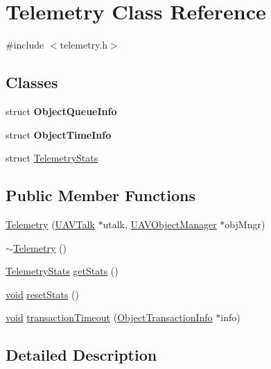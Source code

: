 \hypertarget{class_telemetry}{\section{\-Telemetry \-Class \-Reference}
\label{class_telemetry}
}


{\ttfamily \#include $<$telemetry.\-h$>$}

\subsection*{\-Classes}
\begin{DoxyCompactItemize}
\item 
struct {\bfseries \-Object\-Queue\-Info}
\item 
struct {\bfseries \-Object\-Time\-Info}
\item 
struct \hyperlink{struct_telemetry_1_1_telemetry_stats}{\-Telemetry\-Stats}
\end{DoxyCompactItemize}
\subsection*{\-Public \-Member \-Functions}
\begin{DoxyCompactItemize}
\item 
\hyperlink{group___u_a_v_talk_plugin_ga6998be3c493d7a742d8f54bcf235e823}{\-Telemetry} (\hyperlink{class_u_a_v_talk}{\-U\-A\-V\-Talk} $\ast$utalk, \hyperlink{class_u_a_v_object_manager}{\-U\-A\-V\-Object\-Manager} $\ast$obj\-Mngr)
\item 
\hyperlink{group___u_a_v_talk_plugin_ga5d74297211be2d8d48f38e2632c97de8}{$\sim$\-Telemetry} ()
\item 
\hyperlink{struct_telemetry_1_1_telemetry_stats}{\-Telemetry\-Stats} \hyperlink{group___u_a_v_talk_plugin_ga9f456df92180138a0adebc5e3afc3402}{get\-Stats} ()
\item 
\hyperlink{group___u_a_v_objects_plugin_ga444cf2ff3f0ecbe028adce838d373f5c}{void} \hyperlink{group___u_a_v_talk_plugin_ga6452c56eab6e4b7ce913566562a005ef}{reset\-Stats} ()
\item 
\hyperlink{group___u_a_v_objects_plugin_ga444cf2ff3f0ecbe028adce838d373f5c}{void} \hyperlink{group___u_a_v_talk_plugin_gab5d172ba63e07316e086a65c5bcc8d47}{transaction\-Timeout} (\hyperlink{class_object_transaction_info}{\-Object\-Transaction\-Info} $\ast$info)
\end{DoxyCompactItemize}


\subsection{\-Detailed \-Description}


